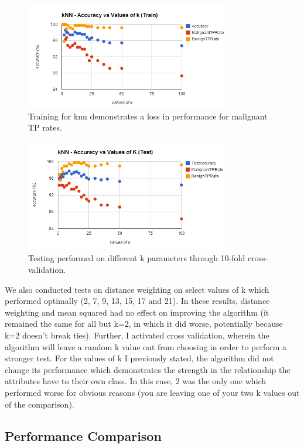 \documentclass[annual]{acmsiggraph}
\begin{document}
\begin{figure}[ht]
  \centering
  \includegraphics[width=3.5in]{charts/chart_2_knn_d1.png}
  \caption{Training for knn demonstrates a loss in performance for malignant TP rates.}
  \label{fig:knn2d1}
\end{figure}

\begin{figure}[ht]
  \centering
  \includegraphics[width=3.5in]{charts/chart_1_knn_d1.png}
  \caption{Testing performed on different k parameters through 10-fold cross-validation.}
  \label{fig:knn1d1}
\end{figure}

We also conducted tests on distance weighting on select values of k which performed optimally (2, 7, 9, 13, 15, 17 and 21). In these
results, distance weighting and mean squared had no effect on improving the algorithm (it remained the same for all but k=2, in which 
it did worse, potentially because k=2 doesn't break ties). Further, I activated cross validation, wherein the algorithm will leave
a random k value out from choosing in order to perform a stronger test. For the values of k I previously stated, the algorithm did
not change its performance which demonstrates the strength in the relationship the attributes have to their own class. In this case,
2 was the only one which performed worse for obvious reasons (you are leaving one of your two k values out of the comparison).

\subsection{Performance Comparison}
\end{document}
